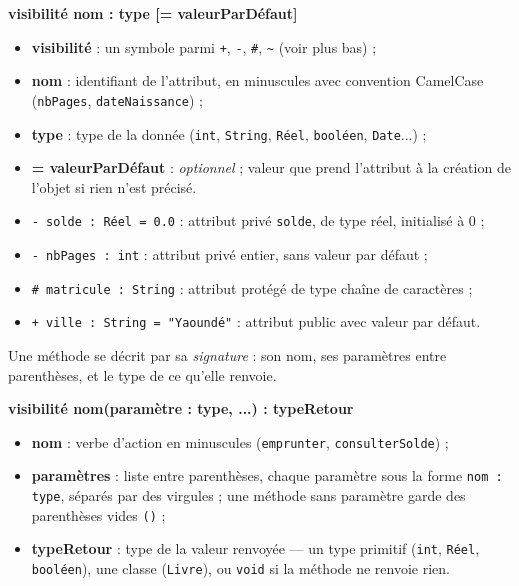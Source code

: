 \documentclass[11pt]{article}
\newcounter{popsec}
\newcounter{popsub}
\newcommand{\courssub}[1]{%
  \stepcounter{popsub}%
  \par\vspace{9pt}\noindent{\popxbold\fontsize{11.5}{13}\selectfont\color{popink}{\color{poporange}\thepopsec.\thepopsub}\hspace{6pt}#1}\par\nopagebreak\vspace{4pt}
}
\begin{document}
\begin{propriete}
\begin{center}
\textbf{visibilité nom : type [= valeurParDéfaut]}
\end{center}
\begin{itemize}
\item \textbf{visibilité} : un symbole parmi \texttt{+}, \texttt{-}, \texttt{\#}, \texttt{\textasciitilde} (voir plus bas) ;
\item \textbf{nom} : identifiant de l'attribut, en minuscules avec convention CamelCase (\texttt{nbPages}, \texttt{dateNaissance}) ;
\item \textbf{type} : type de la donnée (\texttt{int}, \texttt{String}, \texttt{R\'eel}, \texttt{bool\'een}, \texttt{Date}...) ;
\item \textbf{= valeurParDéfaut} : \emph{optionnel} ; valeur que prend l'attribut à la création de l'objet si rien n'est précisé.
\end{itemize}
\end{propriete}

\begin{exemplebox}
\begin{itemize}
\item \texttt{- solde : R\'eel = 0.0} : attribut privé \texttt{solde}, de type réel, initialisé à 0 ;
\item \texttt{- nbPages : int} : attribut privé entier, sans valeur par défaut ;
\item \texttt{\# matricule : String} : attribut protégé de type chaîne de caractères ;
\item \texttt{+ ville : String = "Yaound\'e"} : attribut public avec valeur par défaut.
\end{itemize}
\end{exemplebox}

\courssub{Syntaxe d'une méthode}

Une méthode se décrit par sa \emph{signature} : son nom, ses paramètres entre parenthèses, et le type de ce qu'elle renvoie.

\begin{propriete}
\begin{center}
\textbf{visibilité nom(paramètre : type, ...) : typeRetour}
\end{center}
\begin{itemize}
\item \textbf{nom} : verbe d'action en minuscules (\texttt{emprunter}, \texttt{consulterSolde}) ;
\item \textbf{paramètres} : liste entre parenthèses, chaque paramètre sous la forme \texttt{nom : type}, séparés par des virgules ; une méthode sans paramètre garde des parenthèses vides \texttt{()} ;
\item \textbf{typeRetour} : type de la valeur renvoyée — un type primitif (\texttt{int}, \texttt{R\'eel}, \texttt{bool\'een}), une classe (\texttt{Livre}), ou \texttt{void} si la méthode ne renvoie rien.
\end{itemize}
\end{propriete}
\end{document}
